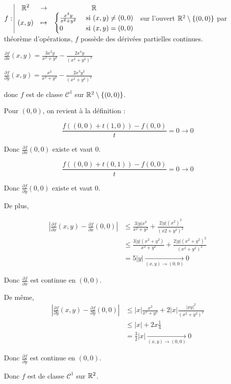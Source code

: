 \begin{exemple}
    $f: \space \begin{array}{|ccc} \displaystyle \mathbb{R}^2 & \to & \displaystyle \mathbb{R} \\ \displaystyle (x, y) & \mapsto & \displaystyle \displaystyle \begin{cases}
        \frac{x^3 y}{x^2 + y^2} & \text{ si } (x, y) \neq (0, 0) \\
        0 & \text{ si } (x, y) = (0, 0)
    \end{cases} \end{array}$ sur l'ouvert $\mathbb{R}^2 \setminus \{(0, 0)\}$ par théorème d'opérations, 
    $f$ possède des dérivées partielles continues. 

    $\displaystyle \frac{\partial f}{\partial x} (x, y) = \frac{3x^2 y}{x^2 + y^2} - \frac{2x^4 y}{(x^2 + y^2)^2}$

    $\displaystyle \frac{\partial f}{\partial y} (x, y) = \frac{x^3}{x^2 + y^2} - \frac{2x^3 y^2}{(x^2 + y^2)^2}$

    donc $f$ est de classe $\mathscr C^1$ sur $\mathbb{R}^2 \setminus \{(0, 0)\}$.

    Pour $(0, 0)$, on revient à la définition : 

    $$\frac{f((0, 0) + t(1, 0)) - f(0, 0)}{t} = 0 \to 0$$

    Donc $\frac{\partial f}{\partial x}(0, 0)$ existe et vaut $0$.

    $$\frac{f((0, 0) + t(0, 1)) - f(0, 0)}{t} = 0 \to 0$$

    Donc $\frac{\partial f}{\partial y}(0, 0)$ existe et vaut $0$.

    De plus, 

    \begin{align}
        \left| \frac{\partial f}{\partial x}(x, y) - \frac{\partial f}{\partial x}(0, 0) \right| & \leqslant \frac{3 |y| x^2}{x^2 + y^2} + \frac{2 |y| (x^2)^2}{(x2 + y^2)^2} \\
        & \leqslant \frac{3 |y| (x^2 + y^2)}{x^2 + y^2} + \frac{2 |y| (x^2 + y^2)^2}{(x^2 + y^2)^2} \\
        & = 5 |y| \xrightarrow[(x, y) \to (0, 0)]{} 0
    \end{align}

    Donc $\frac{\partial f}{\partial x}$ est continue en $(0, 0)$. 

    De même, 
    \begin{align}
        \left| \frac{\partial f}{\partial y}(x, y) - \frac{\partial f}{\partial y}(0, 0) \right| & \leqslant |x| \frac{x^2}{x^2 + y^2} + 2 |x| \frac{|xy|^2}{(x^2 + y^2)^2} \\
        & \leqslant |x| + 2x \frac 1 4 \\
        & = \frac 3 2 |x| \xrightarrow[(x, y) \to (0, 0)]{} 0
    \end{align}

    Donc $\frac{\partial f}{\partial y}$ est continue en $(0, 0)$.

    Donc $f$ est de classe $\mathscr C^1$ sur $\mathbb{R}^2$.
\end{exemple}

